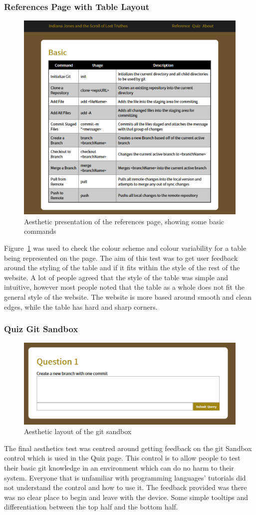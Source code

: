 \subsubsection{References Page with Table Layout}
\begin{figure}[H]
	\centering
	\includegraphics[width=0.8\linewidth]{refs}
	\caption{Aesthetic presentation of the references page, showing some basic commands}\label{fig:refs}
\end{figure}
Figure~\ref{fig:refs} was used to check the colour scheme and colour variability for a table being represented on the page. The aim of this test was to get user feedback around the styling of the table and if it fits within the style of the rest of the website. A lot of people agreed that the style of the table was simple and intuitive, however most people noted that the table as a whole does not fit the general style of the website. The website is more based around smooth and clean edges, while the table has hard and sharp corners.

\subsubsection{Quiz Git Sandbox}
\begin{figure}[H]
	\centering
	\includegraphics[width=0.8\linewidth]{terminal}
	\caption{Aesthetic layout of the \gls{git} sandbox}\label{fig:sandbox}
\end{figure}
The final aesthetics test was centred around getting feedback on the \gls{git} Sandbox control which is used in the Quiz page. This control is to allow people to test their basic \gls{git} knowledge in an environment which can do no harm to their system. Everyone that is unfamiliar with programming languages' tutorials did not understand the control and how to use it. The feedback provided was there was no clear place to begin and leave with the device. Some simple tooltips and differentiation between the top half and the bottom half.
